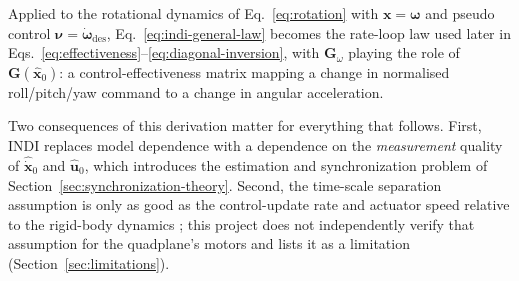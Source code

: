 \documentclass{article}
\begin{document}
Applied to the rotational dynamics of Eq.~\eqref{eq:rotation} with $\mathbf{x}=\boldsymbol{\omega}$ and pseudo control $\boldsymbol{\nu}=\dot{\boldsymbol{\omega}}_{\mathrm{des}}$, Eq.~\eqref{eq:indi-general-law} becomes the rate-loop law used later in Eqs.~\eqref{eq:effectiveness}--\eqref{eq:diagonal-inversion}, with $\mathbf{G}_\omega$ playing the role of $\mathbf{G}(\hat{\mathbf{x}}_0)$: a control-effectiveness matrix mapping a change in normalised roll/pitch/yaw command to a change in angular acceleration.

Two consequences of this derivation matter for everything that follows. First, INDI replaces model dependence with a dependence on the \emph{measurement} quality of $\hat{\dot{\mathbf{x}}}_0$ and $\hat{\mathbf{u}}_0$, which introduces the estimation and synchronization problem of Section~\ref{sec:synchronization-theory}. Second, the time-scale separation assumption is only as good as the control-update rate and actuator speed relative to the rigid-body dynamics \citep{sieberling2010}; this project does not independently verify that assumption for the quadplane's motors and lists it as a limitation (Section~\ref{sec:limitations}).
\end{document}
